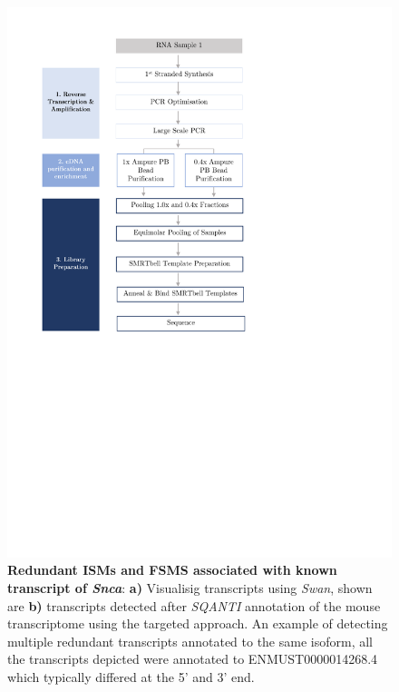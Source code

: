 \begin{figure}[htp]
	\begin{center}
		\includegraphics[page=10,trim={0cm 0cm 0 0cm},clip, scale = 0.7]{Figures/ProjectDevelopment_Figures.pdf}
	\end{center}
	\captionsetup{width=0.95\textwidth}
	\caption[Redundant ISMs and FSMs associated with same known isoform]%
	{\textbf{Redundant ISMs and FSMS associated with known transcript of \textit{Snca}}: \textbf{a)} Visualisig transcripts using \textit{Swan}, shown are \textbf{b)} transcripts detected after \textit{SQANTI} annotation of the mouse transcriptome using the targeted approach. An example of detecting multiple redundant transcripts annotated to the same isoform, all the transcripts depicted were annotated to ENMUST0000014268.4 which typically differed at the 5' and 3' end.}
	\label{fig:redudant_sncatranscripts}
\end{figure}

